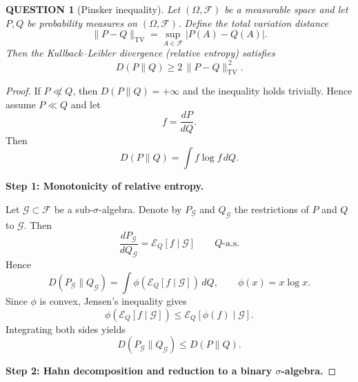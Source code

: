 \documentclass[12pt]{article}
\renewcommand{\(}{\left(}%
\renewcommand{\)}{\right)}%
\renewcommand{\[}{\left[}%
\renewcommand{\]}{\right]}%
\newcommand{\e}{\mathscr{E}}
\newtheorem{question}{QUESTION}[section]}
\newtheorem{proof}{Proof.}}
\begin{document}
\begin{question}[Pinsker inequality]
Let $(\Omega,\mathcal F)$ be a measurable space and let $P,Q$ be
probability measures on $(\Omega,\mathcal F)$. Define the total
variation distance
\begin{equation*}
\|P-Q\|_{\mathrm{TV}}
=
\sup_{A\in\mathcal F}|P(A)-Q(A)|.
\end{equation*}
Then the Kullback--Leibler divergence (relative entropy) satisfies
\begin{equation*}
D(P\|Q)\ge 2\,\|P-Q\|_{\mathrm{TV}}^{\,2}.
\end{equation*}
\end{question}

\begin{proof}
If $P\not\ll Q$, then $D(P\|Q)=+\infty$ and the inequality holds
trivially. Hence assume $P\ll Q$ and let
\begin{equation*}
f=\frac{dP}{dQ}.
\end{equation*}
Then
\begin{equation*}
D(P\|Q)=\int f\log f\,dQ.
\end{equation*}

\medskip
\noindent
\textbf{Step 1: Monotonicity of relative entropy.}

Let $\mathcal G\subset\mathcal F$ be a sub-$\sigma$-algebra.
Denote by $P_{\mathcal G}$ and $Q_{\mathcal G}$ the restrictions of
$P$ and $Q$ to $\mathcal G$. Then
\begin{equation*}
\frac{dP_{\mathcal G}}{dQ_{\mathcal G}}
=
\e_Q[f\mid\mathcal G]
\qquad Q\text{-a.s.}
\end{equation*}
Hence
\begin{equation*}
D(P_{\mathcal G}\|Q_{\mathcal G})
=
\int \phi(\e_Q[f\mid\mathcal G])\,dQ,
\qquad
\phi(x)=x\log x.
\end{equation*}
Since $\phi$ is convex, Jensen's inequality gives
\begin{equation*}
\phi(\e_Q[f\mid\mathcal G])
\le
\e_Q[\phi(f)\mid\mathcal G].
\end{equation*}
Integrating both sides yields
\begin{equation*}
D(P_{\mathcal G}\|Q_{\mathcal G})
\le
D(P\|Q).
\end{equation*}

\medskip
\noindent
\textbf{Step 2: Hahn decomposition and reduction to a binary
$\sigma$-algebra.}


\end{proof}
\end{document}
